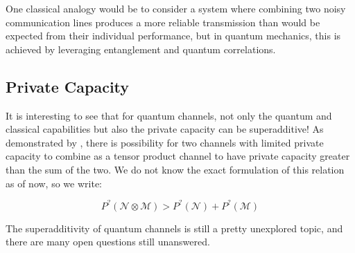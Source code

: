One classical analogy would be to consider a system where combining two noisy communication
lines produces a more reliable transmission than would be expected from their individual
performance, but in quantum mechanics, this is achieved by leveraging entanglement and quantum
correlations.

\subsection{Private Capacity}

It is interesting to see that for quantum channels, not only the quantum and classical capabilities
but also the private capacity can be superadditive! As demonstrated by \cite{Li_2009}, there is
possibility for two channels with limited private capacity to combine as a tensor product channel
to have private capacity greater than the sum of the two. We do not know the exact formulation of
this relation as of now, so we write:

\begin{equation}
    P^?(\mathcal{N} \otimes \mathcal{M}) > P^?(\mathcal{N}) + P^?(\mathcal{M})
\end{equation}

The superadditivity of quantum channels is still a pretty unexplored topic, and there are many open
questions still unanswered.